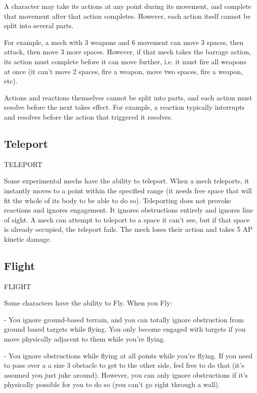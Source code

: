 A character may take its actions at any point during its movement, and complete that movement 
after that action completes. However, each action itself cannot be split into several parts. 

For example, a mech with 3 weapons and 6 movement can move 3 spaces, then attack, then 
move 3 more spaces. However, if that mech takes the barrage action, its action must complete 
before it can move further, i.e. it must fire all weapons at once (it can’t move 2 spaces, fire a 
weapon, move two spaces, fire a weapon, etc). 

Actions and reactions themselves cannot be split into parts, and each action must resolve before 
the next takes effect. For example, a reaction typically interrupts and resolves before the action 
that triggered it resolves. 

\subsection{Teleport}
                                                TELEPORT 

Some experimental mechs have the ability to teleport. When a mech teleports, it instantly moves 
to a point within the specified range (it needs free space that will fit the whole of its body to be 
able to do so). Teleporting does not provoke reactions and ignores engagement. It ignores 
obstructions entirely and ignores line of sight. A mech can attempt to teleport to a space it can’t 
see, but if that space is already occupied, the teleport fails. The mech loses their action and takes 
5 AP kinetic damage. 

\subsection{Flight}
                                                   FLIGHT 

Some characters have the ability to Fly. When you Fly: 

                                                                                                                


    -    You ignore ground-based terrain, and you can totally ignore obstruction from ground  
         based targets while flying. You only become engaged with targets if you move physically  
         adjacent to them while you’re flying.
 
    -    You ignore obstructions while flying at all points while you’re flying. If you need to pass  
         over a a size 3 obstacle to get to the other side, feel free to do that (it’s assumed you just  
         juke around). However, you can only ignore obstructions if it’s physically possible for you  
         to do so (you can’t go right through a wall).
 
